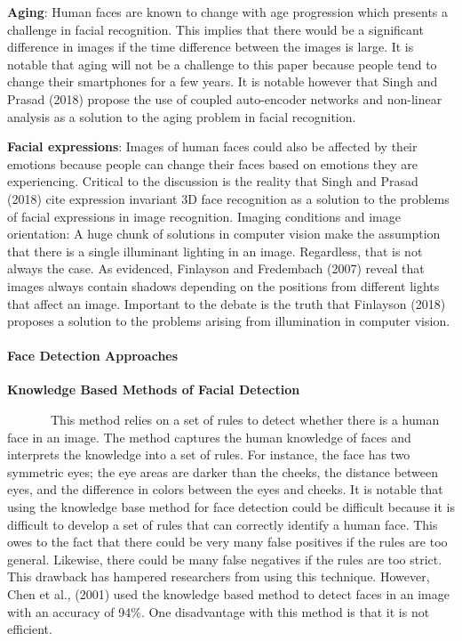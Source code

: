 \documentclass[
  12pt,
]{article}
\begin{document}
\textbf{Aging}: Human faces are known to change with age progression
which presents a challenge in facial recognition. This implies that
there would be a significant difference in images if the time difference
between the images is large. It is notable that aging will not be a
challenge to this paper because people tend to change their smartphones
for a few years. It is notable however that Singh and Prasad (2018)
propose the use of coupled auto-encoder networks and non-linear analysis
as a solution to the aging problem in facial recognition.

\textbf{Facial expressions}: Images of human faces could also be
affected by their emotions because people can change their faces based
on emotions they are experiencing. Critical to the discussion is the
reality that Singh and Prasad (2018) cite expression invariant 3D face
recognition as a solution to the problems of facial expressions in image
recognition. Imaging conditions and image orientation: A huge chunk of
solutions in computer vision make the assumption that there is a single
illuminant lighting in an image. Regardless, that is not always the
case. As evidenced, Finlayson and Fredembach (2007) reveal that images
always contain shadows depending on the positions from different lights
that affect an image. Important to the debate is the truth that
Finlayson (2018) proposes a solution to the problems arising from
illumination in computer vision.

\paragraph{\texorpdfstring{Face Detection Approaches\\
}{Face Detection Approaches }}\label{face-detection-approaches}

\textbf{Knowledge Based Methods of Facial Detection}\\
\vspace{-2.8em}

~~~~~~~This method relies on a set of rules to detect whether there is a
human face in an image. The method captures the human knowledge of faces
and interprets the knowledge into a set of rules. For instance, the face
has two symmetric eyes; the eye areas are darker than the cheeks, the
distance between eyes, and the difference in colors between the eyes and
cheeks. It is notable that using the knowledge base method for face
detection could be difficult because it is difficult to develop a set of
rules that can correctly identify a human face. This owes to the fact
that there could be very many false positives if the rules are too
general. Likewise, there could be many false negatives if the rules are
too strict. This drawback has hampered researchers from using this
technique. However, Chen et al., (2001) used the knowledge based method
to detect faces in an image with an accuracy of 94\%. One disadvantage
with this method is that it is not efficient.
\end{document}
